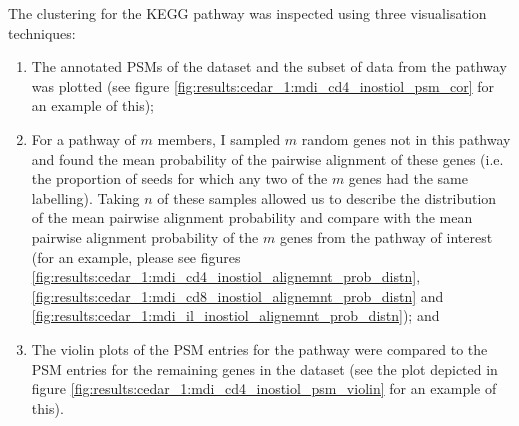 \documentclass[12pt]{article} %
\begin{document}
	\newpage
	
%
%
		
	\newpage
	
	The clustering for the KEGG pathway was inspected using three visualisation techniques:
	\begin{enumerate}
		\item The annotated PSMs of the dataset and the subset of data from the pathway was plotted (see figure \ref{fig:results:cedar_1:mdi_cd4_inostiol_psm_cor} for an example of this);
		\item For a pathway of $m$ members, I sampled $m$ random genes not in this pathway and found the mean probability of the pairwise alignment of these genes (i.e. the proportion of seeds for which any two of the $m$ genes had the same labelling). Taking $n$ of these samples allowed us to describe the distribution of the mean pairwise alignment probability and compare with the mean pairwise alignment probability of the $m$ genes from the pathway of interest (for an example, please see figures \ref{fig:results:cedar_1:mdi_cd4_inostiol_alignemnt_prob_distn}, \ref{fig:results:cedar_1:mdi_cd8_inostiol_alignemnt_prob_distn} and \ref{fig:results:cedar_1:mdi_il_inostiol_alignemnt_prob_distn}); and
		\item The violin plots of the PSM entries for the pathway were compared to the PSM entries for the remaining genes in the dataset (see the plot depicted in figure \ref{fig:results:cedar_1:mdi_cd4_inostiol_psm_violin} for an example of this).
	\end{enumerate}
	
	
\end{document}
